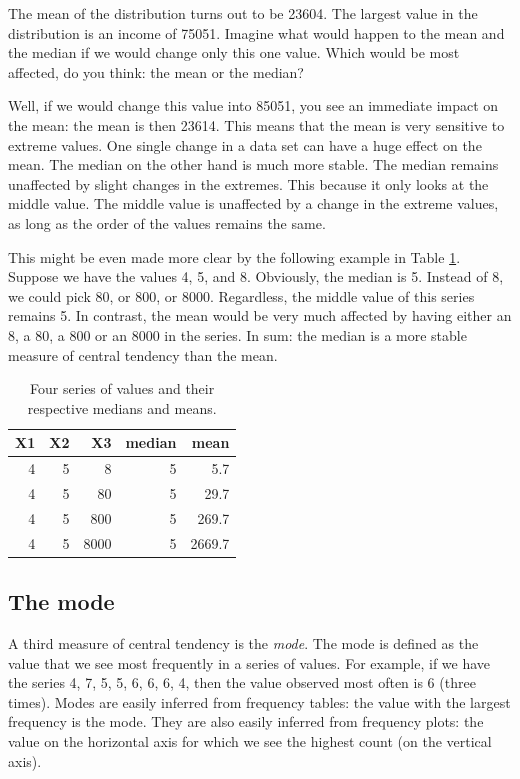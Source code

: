 \documentclass[]{report}\usepackage[]{graphicx}\usepackage[]{color}
\begin{document}
The mean of the distribution turns out to be 23604. The largest value in the distribution is an income of 75051. Imagine what would happen to the mean and the median if we would change only this one value. Which would be most affected, do you think: the mean or the median?



Well, if we would change this value into 85051, you see an immediate impact on the mean: the mean is then 23614. This means that the mean is very sensitive to extreme values. One single change in a data set can have a huge effect on the mean. The median on the other hand is much more stable. The median remains unaffected by slight changes in the extremes. This because it only looks at the middle value. The middle value is unaffected by a change in the extreme values, as long as the order of the values remains the same.

This might be even made more clear by the following example in Table \ref{tab:median_2}. Suppose we have the values 4, 5, and 8. Obviously, the median is 5. Instead of 8, we could pick 80, or 800, or 8000. Regardless, the middle value of this series remains 5. In contrast, the mean would be very much affected by having either an 8, a 80, a 800 or an 8000 in the series. In sum: the median is a more stable measure of central tendency than the mean.


\begin{table}[ht]
\centering
\caption{Four series of values and their respective medians and means.} 
\label{tab:median_2}
\begin{tabular}{rrrrr}
  \hline
X1 & X2 & X3 & median & mean \\ 
  \hline
4 & 5 & 8 & 5 & 5.7 \\ 
  4 & 5 & 80 & 5 & 29.7 \\ 
  4 & 5 & 800 & 5 & 269.7 \\ 
  4 & 5 & 8000 & 5 & 2669.7 \\ 
   \hline
\end{tabular}
\end{table}




\subsection{The mode}
A third measure of central tendency is the \textit{mode}. The mode is defined as the value that we see most frequently in a series of values. For example, if we have the series 4, 7, 5, 5, 6, 6, 6, 4, then the value observed most often is 6 (three times). Modes are easily inferred from frequency tables: the value with the largest frequency is the mode. They are also easily inferred from frequency plots: the value on the horizontal axis for which we see the highest count (on the vertical axis).
\end{document}
